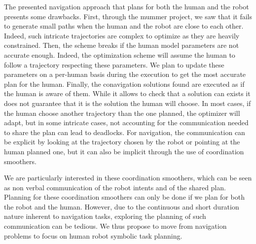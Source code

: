 \documentclass[a4paper,11pt,twoside]{StyleThese}
\begin{document}
The presented navigation approach that plans for both the human and the robot presents some drawbacks. First, through the \acrshort{mummer} project, we saw that it fails to generate small paths when the human and the robot are close to each other. Indeed, such intricate trajectories are complex to optimize as they are heavily constrained. Then, the scheme breaks if the human model parameters are not accurate enough. Indeed, the optimization scheme will assume the human to follow a trajectory respecting these parameters. We plan to update these parameters on a per-human basis during the execution to get the most accurate plan for the human. Finally, the conavigation solutions found are executed as if the human is aware of them. While it allows to check that a solution can exists it does not guarantee that it is the solution the human will choose. In most cases, if the human choose another trajectory than the one planned, the optimizer will adapt, but in some intricate cases, not accounting for the communication needed to share the plan can lead to deadlocks. For navigation, the communication can be explicit by looking at the trajectory chosen by the robot or pointing at the human planned one, but it can also be implicit through the use of coordination smoothers.

We are particularly interested in these coordination smoothers, which can be seen as non verbal communication of the robot intents and of the shared plan. Planning for these coordination smoothers can only be done if we plan for both the robot and the human. However, due to the continuous and short duration nature inherent to navigation tasks, exploring the planning of such communication can be tedious. We thus propose to move from navigation problems to focus on human robot symbolic task planning.


\ifdefined{}
\else


\end{document}
